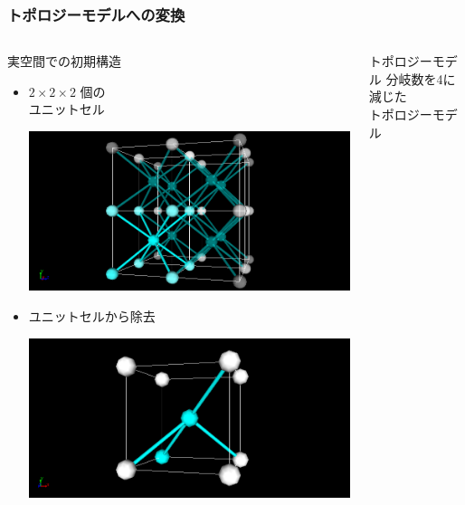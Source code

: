 \documentclass[12pt, dvipdfmx]{beamer}
\begin{document}
\begin{frame}
	\frametitle{トポロジーモデルへの変換}
		\begin{columns}[totalwidth=\textwidth]
				\begin{block}{実空間での初期構造}
					\begin{itemize}
						\item $2\times2\times2$ 個の\\ユニットセル
			
							\includegraphics[width=0.8\columnwidth]{8_per.png}

						\item ユニットセルから除去

							\includegraphics[width=0.8\columnwidth]{8_4.png}

					\end{itemize}
				\end{block}
			\begin{exampleblock}{トポロジーモデル}
				分岐数を4に減じた\\トポロジーモデル


\end{exampleblock}
\end{columns}
\end{frame}
\end{document}
